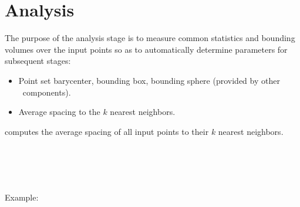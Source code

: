 \section{Analysis}

The purpose of the analysis stage is to measure common statistics and bounding volumes over the input points so as to automatically determine parameters for subsequent stages:
\begin{itemize}
  \item Point set barycenter, bounding box,
        bounding sphere (provided by other \cgal\ components).
  \item Average spacing to the $k$ nearest neighbors.
\end{itemize}

 computes the average spacing of all input points to their $k$ nearest neighbors.

  \\
  \\
  \\
  \\

Example:

